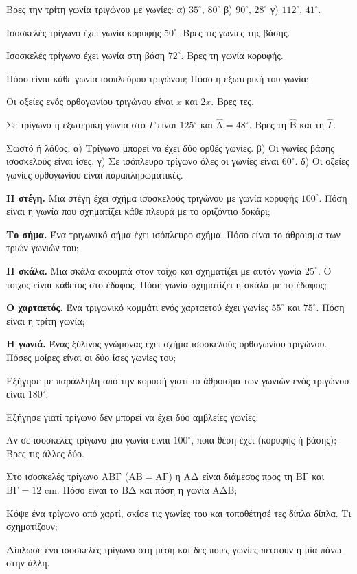 

\ex Βρες την τρίτη γωνία τριγώνου με γωνίες: α) $35^\circ,\,80^\circ$ β) $90^\circ,\,28^\circ$ γ) $112^\circ,\,41^\circ$.

\ex Ισοσκελές τρίγωνο έχει γωνία κορυφής $50^\circ$. Βρες τις γωνίες της βάσης.

\ex Ισοσκελές τρίγωνο έχει γωνία στη βάση $72^\circ$. Βρες τη γωνία κορυφής.

\ex Πόσο είναι κάθε γωνία ισοπλεύρου τριγώνου; Πόσο η εξωτερική του γωνία;

\ex Οι οξείες ενός ορθογωνίου τριγώνου είναι $x$ και $2x$. Βρες τες.

\ex Σε τρίγωνο η εξωτερική γωνία στο $\Gamma$ είναι $125^\circ$ και $\hat{\mathrm{Α}}=48^\circ$. Βρες τη $\hat{\mathrm{Β}}$ και τη $\hat{\Gamma}$.

\ex Σωστό ή λάθος; α) Τρίγωνο μπορεί να έχει δύο ορθές γωνίες. \quad β) Οι γωνίες βάσης ισοσκελούς είναι ίσες. \quad γ) Σε ισόπλευρο τρίγωνο όλες οι γωνίες είναι $60^\circ$. \quad δ) Οι οξείες γωνίες ορθογωνίου είναι παραπληρωματικές.


\ex \textbf{Η στέγη.} Μια στέγη έχει σχήμα ισοσκελούς τριγώνου με γωνία κορυφής $100^\circ$. Πόση είναι η γωνία που σχηματίζει κάθε πλευρά με το οριζόντιο δοκάρι;

\ex \textbf{Το σήμα.} Ένα τριγωνικό σήμα έχει ισόπλευρο σχήμα. Πόσο είναι το άθροισμα των τριών γωνιών του;

\ex \textbf{Η σκάλα.} Μια σκάλα ακουμπά στον τοίχο και σχηματίζει με αυτόν γωνία $25^\circ$. Ο τοίχος είναι κάθετος στο έδαφος. Πόση γωνία σχηματίζει η σκάλα με το έδαφος;

\ex \textbf{Ο χαρταετός.} Ένα τριγωνικό κομμάτι ενός χαρταετού έχει γωνίες $55^\circ$ και $75^\circ$. Πόση είναι η τρίτη γωνία;

\ex \textbf{Η γωνιά.} Ένας ξύλινος γνώμονας έχει σχήμα ισοσκελούς ορθογωνίου τριγώνου. Πόσες μοίρες είναι οι δύο ίσες γωνίες του;


\ex Εξήγησε με παράλληλη από την κορυφή γιατί το άθροισμα των γωνιών ενός τριγώνου είναι $180^\circ$.

\ex Εξήγησε γιατί τρίγωνο δεν μπορεί να έχει δύο αμβλείες γωνίες.

\ex Αν σε ισοσκελές τρίγωνο μια γωνία είναι $100^\circ$, ποια θέση έχει (κορυφής ή βάσης); Βρες τις άλλες δύο.

\ex Στο ισοσκελές τρίγωνο $\mathrm{ΑΒΓ}$ ($\mathrm{ΑΒ}=\mathrm{ΑΓ}$) η $\mathrm{ΑΔ}$ είναι διάμεσος προς τη $\mathrm{ΒΓ}$ και $\mathrm{ΒΓ}=12$ cm. Πόσο είναι το $\mathrm{ΒΔ}$ και πόση η γωνία $\mathrm{ΑΔΒ}$;


\ex Κόψε ένα τρίγωνο από χαρτί, σκίσε τις γωνίες του και τοποθέτησέ τες δίπλα δίπλα. Τι σχηματίζουν;

\ex Δίπλωσε ένα ισοσκελές τρίγωνο στη μέση και δες ποιες γωνίες πέφτουν η μία πάνω στην άλλη.
